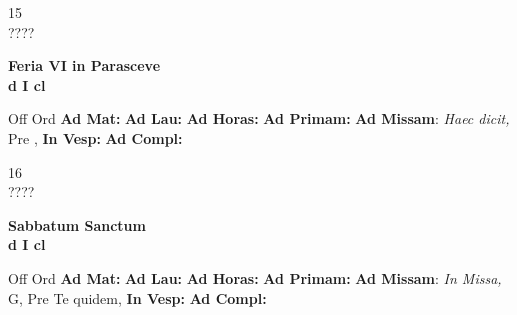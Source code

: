 \documentclass[10pt, openany]{book}
\begin{document}
    \begin{center}
        \begin{minipage}{3.5in}
            \vspace{2em}
            \begin{minipage}{0.5in}
                {\Huge 15} \\
                {\normalsize ????}
            \end{minipage}
            \begin{minipage}{3.0in}
                \textbf{ \large Feria VI in Parasceve \\
                \textnormal{\normalsize d I cl}}

            \end{minipage}
            \begin{justify}Off Ord
                \textbf{Ad Mat: }
                \textbf{Ad Lau: }
                \textbf{Ad Horas: }
                \textbf{Ad Primam: }\textbf{Ad Missam}: \textit{Haec dicit,} Pre , 
                \textbf{In Vesp: }
                \textbf{Ad Compl: }
            \end{justify}
        \end{minipage}
    \end{center}

    \begin{center}
        \begin{minipage}{3.5in}
            \vspace{2em}
            \begin{minipage}{0.5in}
                {\Huge 16} \\
                {\normalsize ????}
            \end{minipage}
            \begin{minipage}{3.0in}
                \textbf{ \large Sabbatum Sanctum \\
                \textnormal{\normalsize d I cl}}

            \end{minipage}
            \begin{justify}Off Ord
                \textbf{Ad Mat: }
                \textbf{Ad Lau: }
                \textbf{Ad Horas: }
                \textbf{Ad Primam: }\textbf{Ad Missam}: \textit{In Missa,} G, Pre Te quidem, 
                \textbf{In Vesp: }
                \textbf{Ad Compl: }
            \end{justify}
        \end{minipage}
    \end{center}
\end{document}
